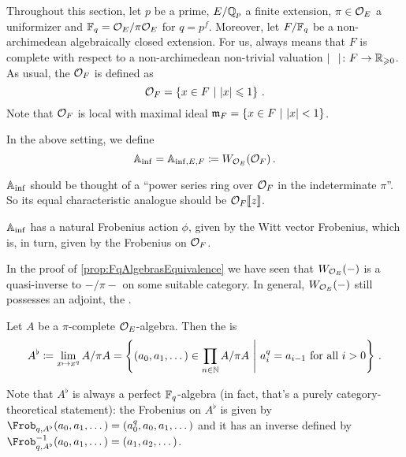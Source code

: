 Throughout this section, let $p$ be a prime, $E/\mathbb{Q}_p$ a finite extension, $\pi\in \mathcal{O}_E$ a uniformizer and $\mathbb{F}_q=\mathcal{O}_E/\pi\mathcal{O}_E$ for $q=p^f$. Moreover, let $F/\mathbb{F}_q$ be a non-archimedean algebraically closed extension. For us,  always means that $F$ is complete with respect to a non-archimedean non-trivial valuation $|\blank|\colon F\morphism\IR_{\geq 0}$. As usual, the  $\mathcal{O}_F$ is defined as
\begin{equation*}
	\mathcal{O}_F=\left\{x\in F\ \middle|\  |x|\leqslant 1\right\}\,.
\end{equation*}
Note that $\mathcal{O}_F$ is local with maximal ideal $\mathfrak{m}_F=\left\{x\in F\ \middle|\ |x|<1\right\}$.
\begin{defi}
	In the above setting, we define
	\begin{equation*}
		\mathbb{A}_{\mathrm{inf}}=\mathbb{A}_{\mathrm{inf},E,F}\coloneqq W_{\mathcal{O}_E}(\mathcal{O}_F)\,.
	\end{equation*}
\end{defi}
\begin{rem}
	\begin{numerate}
		\item $\mathbb{A}_{\mathrm{inf}}$ should be thought of a \enquote{power series ring over $\mathcal{O}_F$ in the indeterminate $\pi$}. So its equal characteristic analogue should be $\mathcal{O}_F\llbracket z\rrbracket$.
		\item $\mathbb{A}_{\mathrm{inf}}$ has a natural Frobenius action $\phi$, given by the Witt vector Frobenius, which is, in turn, given by the Frobenius on $\mathcal{O}_F$.
	\end{numerate}
\end{rem}
In the proof of \cref{prop:FqAlgebrasEquivalence} we have seen that $W_{\mathcal{O}_E}(-)$ is a quasi-inverse to $-/\pi -$ on some suitable category. In general, $W_{\mathcal{O}_E}(-)$ still possesses an adjoint, the .
\begin{defi}
	Let $A$ be a $\pi$-complete $\mathcal{O}_E$-algebra. Then the  is
	\begin{equation*}
		A^\flat\coloneqq \operatorname*{lim}_{x\mapsto x^q}A/\pi A=\left\{(a_0,a_1,\dotsc)\in\prod_{n\in\mathbb{N}}A/\pi A\ \middle|\  a_i^q=a_{i-1}\text{ for all }i>0\right\}\,.
	\end{equation*}
\end{defi}
Note that $A^\flat$ is always a perfect $\mathbb{F}_q$-algebra (in fact, that's a purely category-theoretical statement): the Frobenius on $A^\flat$ is given by $\Frob_{q,A^\flat}(a_0,a_1,\dotsc)=(a_0^q,a_0,a_1,\dotsc)$ and it has an inverse defined by $\Frob_{q,A^\flat}^{-1}(a_0,a_1,\dotsc)=(a_1,a_2,\dotsc)$.
